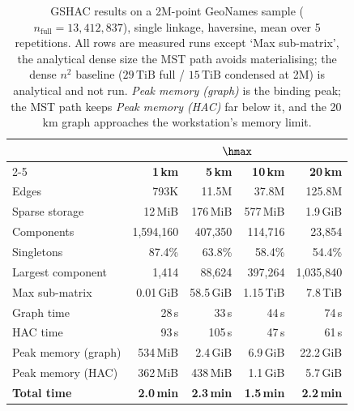 \begin{table}[t]
\caption{GSHAC results on a 2M-point GeoNames sample
  (\(n_{\text{full}} = 13{,}412{,}837\)), single linkage, haversine,
  mean over 5 repetitions.
  All rows are measured runs except `Max sub-matrix', the analytical dense size
  the MST path avoids materialising; the dense \(n^2\) baseline
  (\(29\,\text{TiB}\) full /
  \(15\,\text{TiB}\) condensed at 2M) is analytical and
  not run. \emph{Peak memory (graph)} is the binding peak; the MST path keeps
  \emph{Peak memory (HAC)} far below it, and the 20\,km graph approaches the
  workstation's memory limit.}
\label{tab:geonames}
\small
\begin{tabular}{lrrrr}
\toprule
& \multicolumn{4}{c}{\(\hmax\)} \\
\cmidrule(l){2-5}
& \textbf{1\,km} & \textbf{5\,km} & \textbf{10\,km} & \textbf{20\,km} \\
\midrule
Edges & 793K & 11.5M & 37.8M & 125.8M \\
Sparse storage & 12\,MiB & 176\,MiB & 577\,MiB & 1.9\,GiB \\
Components & 1{,}594{,}160 & 407{,}350 & 114{,}716 & 23{,}854 \\
Singletons & 87.4\% & 63.8\% & 58.4\% & 54.4\% \\
Largest component & 1{,}414 & 88{,}624 & 397{,}264 & 1{,}035{,}840 \\
Max sub-matrix & 0.01\,GiB & 58.5\,GiB & 1.15\,TiB & 7.8\,TiB \\
\addlinespace
Graph time & 28\,s & 33\,s & 44\,s & 74\,s \\
HAC time & 93\,s & 105\,s & 47\,s & 61\,s \\
Peak memory (graph) & 534\,MiB & 2.4\,GiB & 6.9\,GiB & 22.2\,GiB \\
Peak memory (HAC) & 362\,MiB & 438\,MiB & 1.1\,GiB & 5.7\,GiB \\
\textbf{Total time} & \textbf{2.0\,min} & \textbf{2.3\,min} & \textbf{1.5\,min} & \textbf{2.2\,min} \\
\bottomrule
\end{tabular}
\end{table}